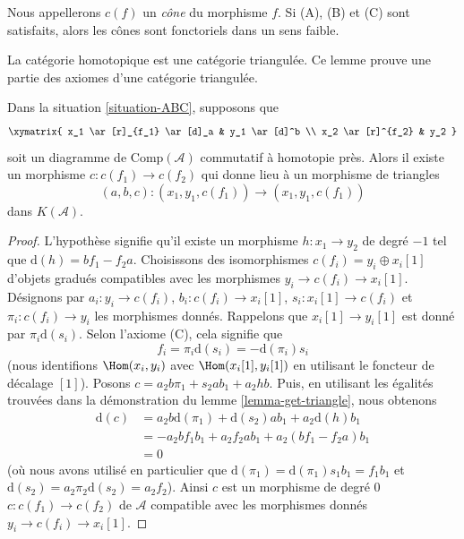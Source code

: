 \noindent
Nous appellerons $c(f)$ un {\it cône} du morphisme $f$. Si (A),
(B) et (C) sont satisfaits, alors les
cônes sont fonctoriels dans un sens faible.

\begin{lemma}
\label{lemma-cone}
\begin{slogan}
La catégorie homotopique est une catégorie
triangulée. Ce lemme prouve une partie des axiomes d'une catégorie triangulée.
\end{slogan}
Dans la situation \ref{situation-ABC}, supposons que
$$
\xymatrix{
x_1 \ar[r]_{f_1} \ar[d]_a & y_1 \ar[d]^b \\
x_2 \ar[r]^{f_2} & y_2
}
$$
soit un diagramme de $\text{Comp}(\mathcal{A})$ commutatif à homotopie
près. Alors il existe un morphisme $c : c(f_1) \to c(f_2)$ qui donne lieu à un
morphisme de triangles
$$
(a, b, c) : (x_1, y_1, c(f_1)) \to (x_1, y_1, c(f_1))
$$
dans $K(\mathcal{A})$.
\end{lemma}

\begin{proof}
L'hypothèse signifie qu'il existe un morphisme $h : x_1 \to y_2$ de degré
$-1$ tel que $\text{d}(h) = b f_1 - f_2 a$. Choisissons des
isomorphismes $c(f_i) = y_i \oplus x_i[1]$ d'objets gradués compatibles avec les
morphismes $y_i \to c(f_i) \to x_i[1]$. Désignons par
$a_i : y_i \to c(f_i)$, $b_i : c(f_i) \to x_i[1]$, $s_i : x_i[1] \to c(f_i)$ et
$\pi_i : c(f_i) \to y_i$ les morphismes donnés. Rappelons que $x_i[1] \to
y_i[1]$ est donné par $\pi_i \text{d}(s_i)$. Selon l'axiome (C), cela
signifie que
$$
f_i = \pi_i \text{d}(s_i) = - \text{d}(\pi_i) s_i
$$
(nous identifions $\Hom(x_i, y_i)$ avec $\Hom(x_i[1], y_i[1])$ en
utilisant le foncteur de décalage $[1]$).
Posons $c = a_2 b \pi_1 + s_2 a b_1 + a_2hb$. Puis, en utilisant les
égalités trouvées dans la démonstration du lemme \ref{lemma-get-triangle}, nous
obtenons
\begin{align*}
\text{d}(c)
& =
a_2 b \text{d}(\pi_1) + \text{d}(s_2) a b_1 + a_2 \text{d}(h) b_1 \\ &
= -
a_2 b f_1 b_1 + a_2 f_2 a b_1 + a_2 (b f_1 - f_2 a) b_1 \\ & =
0
\end{align*}
(où nous avons utilisé en particulier
que $\text{d}(\pi_1) = \text{d}(\pi_1) s_1 b_1 = f_1 b_1$ et
$\text{d}(s_2) = a_2 \pi_2 \text{d}(s_2) = a_2 f_2$).
Ainsi $c$ est un morphisme de degré $0$ $c : c(f_1) \to c(f_2)$ de $\mathcal{A}$
compatible avec les morphismes donnés $y_i \to c(f_i) \to x_i[1]$.
\end{proof}


